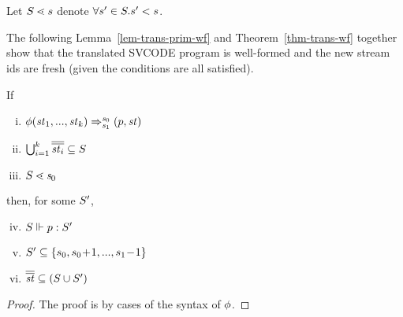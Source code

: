 \begin{itemize}
	\\ [8ex]

	\\[4ex]
	
\end{itemize}


\begin{nota}
	Let $\S \.< s$ denote $\forall s' \in \S. s' < s$.
\end{nota}


The following Lemma~\ref{lem-trans-prim-wf} and Theorem~\ref{thm-trans-wf} together show that the translated SVCODE program is well-formed and the new stream ids are fresh (given the conditions are all satisfied).


\begin{lem} \label{lem-trans-prim-wf}
	If 
	\begin{enumerate}[(i)]
		\item $\Transf{\hcall}{\replc k {\st}} {\s_0} {\s_1} {\sfun{p}{\st}}$ 
		\item $\bigcup_{i=1}^{k}\olol{\st_i} \subseteq \S$
		\item $\S \.< \s_0$
	\end{enumerate}
	then, for some $\S'$,
	\begin{enumerate}[(i)]
		\setcounter{enumi}{3}
		\item $\wf{p}{\S}{\S'}$
		\item $\S' \subseteq \{s_0, s_0\!+\!1,...,s_1\!-\!1\} $
		\item $\olol{\st} \subseteq (\S \cup \S')$
	\end{enumerate}
\end{lem}
\begin{proof}
    The proof is by cases of the syntax of $\hcall$.
\end{proof}


